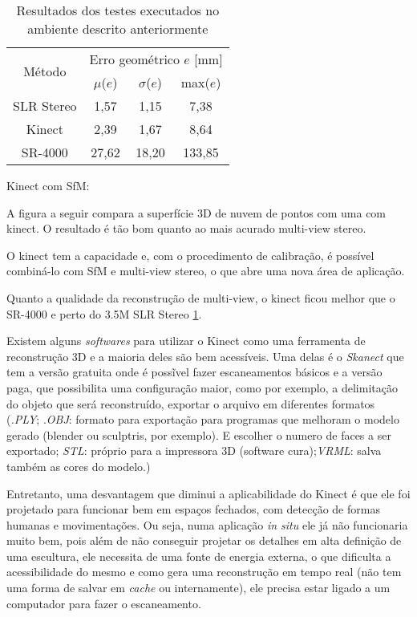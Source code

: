 \begin{table}[htbp]
\caption{Resultados dos testes executados no ambiente descrito anteriormente}
\label{tab:resultadosKinect}
\begin{center}
\begin{tabular}{|c|c|c|c|}
\hline
\multirow{2}{1.5cm}{Método}& \multicolumn{3}{p{5cm}|}{Erro geométrico $e$ [mm]} \bigstrut \\
\cline{2-4} & \multicolumn{1}{c|}{$\mu$($e$)} & \multicolumn{1}{c|}{$\sigma$($e$)} & \multicolumn{1}{c|}{max($e$)} \bigstrut \\ \hline
SLR Stereo & 1,57 & 1,15 & 7,38 \bigstrut \\ \hline
Kinect & 2,39 & 1,67 & 8,64 \bigstrut \\ \hline
SR-4000 & 27,62 & 18,20 & 133,85 \bigstrut \\ 
\hline
\end{tabular}
\end{center}
\end{table}



Kinect com SfM:

A figura a seguir compara a superfície 3D de nuvem de pontos com uma com kinect. O resultado é tão bom quanto ao mais acurado multi-view stereo.

O kinect tem a capacidade e, com o procedimento de calibração, é possível combiná-lo com SfM e multi-view stereo, o que abre uma nova área de aplicação.

Quanto a qualidade da reconstrução de multi-view, o kinect ficou melhor que o SR-4000 e perto do 3.5M SLR Stereo \ref{tab:resultadosKinect}.

Existem alguns {\it softwares} para utilizar o Kinect como uma ferramenta de reconstrução 3D e a maioria deles são bem acessíveis. Uma delas é o {\it Skanect} que tem a versão gratuita onde é possĩvel fazer escaneamentos básicos e a versão paga, que possibilita uma configuração maior, como por exemplo, a delimitação do objeto que será reconstruído, exportar o arquivo em diferentes formatos ({\it .PLY}; {.\it OBJ}: formato para exportação para programas que melhoram o modelo gerado (blender ou sculptris, por exemplo). E escolher o numero de faces a ser exportado; {\it STL}: próprio para a impressora 3D (software cura);{\it VRML}: salva também as cores do modelo.)

Entretanto, uma desvantagem que diminui a aplicabilidade do Kinect é que ele foi projetado para funcionar bem em espaços fechados, com detecção de formas humanas e movimentações. Ou seja, numa aplicação {\it in situ} ele já não funcionaria muito bem, pois além de não conseguir projetar os detalhes em alta definição de uma escultura, ele necessita de uma fonte de energia externa, o que dificulta a acessibilidade do mesmo e como gera uma reconstrução em tempo real (não tem uma forma de salvar em {\it cache} ou internamente), ele precisa estar ligado a um computador para fazer o escaneamento.